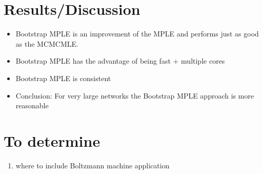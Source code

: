 \documentclass[headsepline=true, abstracton]{scrartcl}
\begin{document}
 \section*{Results/Discussion}
\begin{itemize}
  
 \item  Bootstrap MPLE is an improvement of the MPLE and performs just as good as the MCMCMLE. \\
\item Bootstrap MPLE has the advantage of being fast + multiple cores\\ 
\item Bootstrap MPLE is consistent\\
\item Conclusion: For very large networks the Bootstrap MPLE approach is more reasonable
   
\end{itemize}


 \section*{To determine}
 
 \begin{enumerate}
 \item where to include Boltzmann machine application
\end{enumerate}   
   
   
\newpage


 

\end{document}
